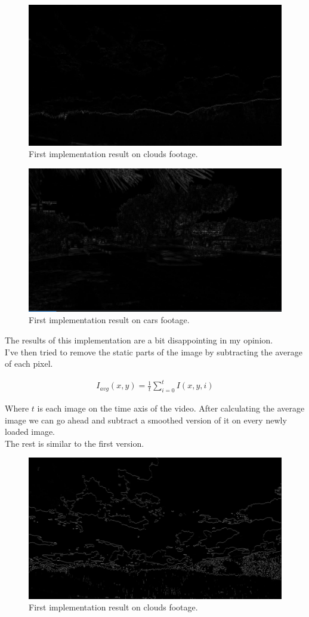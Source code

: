\documentclass[UTF-8]{article}
\begin{document}
\begin{figure}[H]
	\centering
	\includegraphics[width=0.7\linewidth]{_images/spatiotemporal_first1}
	\caption{First implementation result on clouds footage.}
	\label{fig:spatiotemporalfirst1}
\end{figure}
\begin{figure}[H]
	\centering
	\includegraphics[width=0.7\linewidth]{_images/spatiotemporal_first2}
	\caption{First implementation result on cars footage.}
	\label{fig:spatiotemporalfirst2}
\end{figure}
The results of this implementation are a bit disappointing in my opinion.\\
I've then tried to remove the static parts of the image by subtracting the average of each pixel.

\begin{align}
	I_{avg}(x,y) = \frac{1}{t} \sum_{i=0}^{t} I(x,y,i)
\end{align}

Where $t$ is each image on the time axis of the video.
After calculating the average image we can go ahead and subtract a smoothed version of it on every newly loaded image.
\\
The rest is similar to the first version.

\begin{figure}[H]
	\centering
	\includegraphics[width=0.7\linewidth]{_images/spatiotemporal_snd1}
	\caption{First implementation result on clouds footage.}
	\label{fig:spatiotemporalsecond1}
\end{figure}
\end{document}
